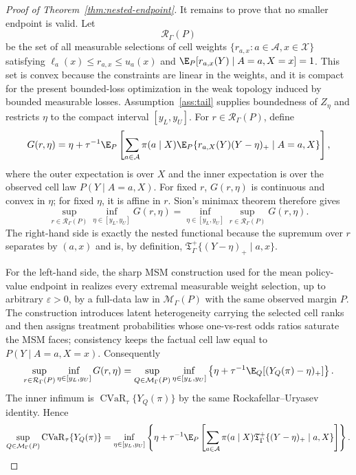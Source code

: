 \begin{proof}[Proof of Theorem~\ref{thm:nested-endpoint}]
It remains to prove that no smaller endpoint is valid.  Let
\[
\mathcal R_\Gamma(P)
\]
be the set of all measurable selections of cell weights
\(\{r_{a,x}:a\in\mathcal A,x\in\mathcal X\}\) satisfying
\(\ell_a(x)\le r_{a,x}\le u_a(x)\) and
\(\E_P[r_{a,x}(Y)\mid A=a,X=x]=1\).  This set is convex because the constraints are linear in the
weights, and it is compact for the present bounded-loss optimization in the weak topology induced by
bounded measurable losses.  Assumption~\ref{ass:tail} supplies boundedness of \(Z_\eta\) and
restricts \(\eta\) to the compact interval \([y_L,y_U]\).  For \(r\in\mathcal R_\Gamma(P)\), define
\[
G(r,\eta)
=
\eta+\tau^{-1}\E_P\left[
\sum_{a\in\mathcal A}\pi(a\mid X)
\E_P\{r_{a,X}(Y)(Y-\eta)_+\mid A=a,X\}
\right],
\]
where the outer expectation is over \(X\) and the inner expectation is over the observed cell law
\(P(Y\mid A=a,X)\).  For
fixed \(r\), \(G(r,\eta)\) is continuous and convex in \(\eta\); for fixed \(\eta\), it is affine in
\(r\).  Sion's minimax theorem therefore gives
\[
\sup_{r\in\mathcal R_\Gamma(P)}\inf_{\eta\in[y_L,y_U]}G(r,\eta)
=
\inf_{\eta\in[y_L,y_U]}\sup_{r\in\mathcal R_\Gamma(P)}G(r,\eta).
\]
The right-hand side is exactly the nested functional because the supremum over \(r\) separates by
\((a,x)\) and is, by definition, \(\mathfrak T_\Gamma^+\{(Y-\eta)_+\mid a,x\}\).

For the left-hand side, the sharp MSM construction used for the mean policy-value endpoint in
\cite{HessFrauenMelnychukFeuerriegel2025SharpOPE} realizes every extremal measurable weight
selection, up to arbitrary \(\varepsilon>0\), by a full-data law in \(\mathcal M_\Gamma(P)\) with the
same observed margin \(P\).  The construction introduces latent heterogeneity carrying the selected
cell ranks and then assigns treatment probabilities whose one-vs-rest odds ratios saturate the
MSM faces; consistency keeps the factual cell law equal to \(P(Y\mid A=a,X=x)\).  Consequently
\[
\sup_{r\in\mathcal R_\Gamma(P)}\inf_{\eta\in[y_L,y_U]}G(r,\eta)
=
\sup_{Q\in\mathcal M_\Gamma(P)}
\inf_{\eta\in[y_L,y_U]}
\left\{\eta+\tau^{-1}\E_Q[(Y_Q(\pi)-\eta)_+]\right\}.
\]
The inner infimum is \(\operatorname{CVaR}_{\tau}\{Y_Q(\pi)\}\) by the same
Rockafellar--Uryasev identity.  Hence
\[
\sup_{Q\in\mathcal M_\Gamma(P)}
\operatorname{CVaR}_{\tau}\{Y_Q(\pi)\}
=
\inf_{\eta\in[y_L,y_U]}
\left\{\eta+\tau^{-1}\E_P\left[
\sum_{a\in\mathcal A}\pi(a\mid X)
\mathfrak T_\Gamma^+\{(Y-\eta)_+\mid a,X\}
\right]\right\}.
\]


\end{proof}
